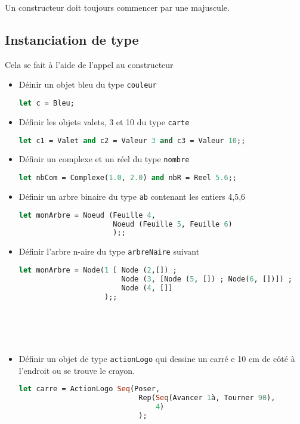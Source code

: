 \begin{attention}
	Un constructeur doit toujours commencer par une majuscule.
\end{attention}

\subsection{Instanciation de type}
Cela se fait à l'aide de l'appel au constructeur
\begin{exemple}
\begin{itemize}
	\item Déinir un objet bleu du type \texttt{couleur}
	\begin{lstlisting}[language=Caml, numbers=none, framerule=0pt]
let c = Bleu;
	\end{lstlisting}
\item Définir les objets valets, 3 et 10 du type \texttt{carte}
	\begin{lstlisting}[language=Caml, numbers=none, framerule=0pt]
let c1 = Valet and c2 = Valeur 3 and c3 = Valeur 10;;
	\end{lstlisting}
\item Définir un complexe et un réel du type \texttt{nombre}
	\begin{lstlisting}[language=Caml, numbers=none, framerule=0pt]
let nbCom = Complexe(1.0, 2.0) and nbR = Reel 5.6;;
	\end{lstlisting}
\item Définir un arbre binaire du type \texttt{ab} contenant les entiers 4,5,6
	\begin{lstlisting}[language=Caml, numbers=none, framerule=0pt]
let monArbre = Noeud (Feuille 4,
					  Noeud (Feuille 5, Feuille 6)
					  );;
	\end{lstlisting}
	\item Définir l'arbre n-aire du type \texttt{arbreNaire} suivant
	\begin{lstlisting}[language=Caml, numbers=none, framerule=0pt]
let monArbre = Node(1 [	Node (2,[]) ; 
						Node (3, [Node (5, []) ; Node(6, [])]) ;
						Node (4, []]
					);;
	\end{lstlisting}
	~\\~\\~
	\item Définir un objet de type \texttt{actionLogo} qui dessine un carré e 10 cm de côté à l'endroit ou se trouve le crayon.
	\begin{lstlisting}[language=Caml, numbers=none, framerule=0pt]
let carre = ActionLogo Seq(Poser, 
							Rep(Seq(Avancer 1à, Tourner 90),
								4)
							);
	\end{lstlisting}
\end{itemize}
\end{exemple}

